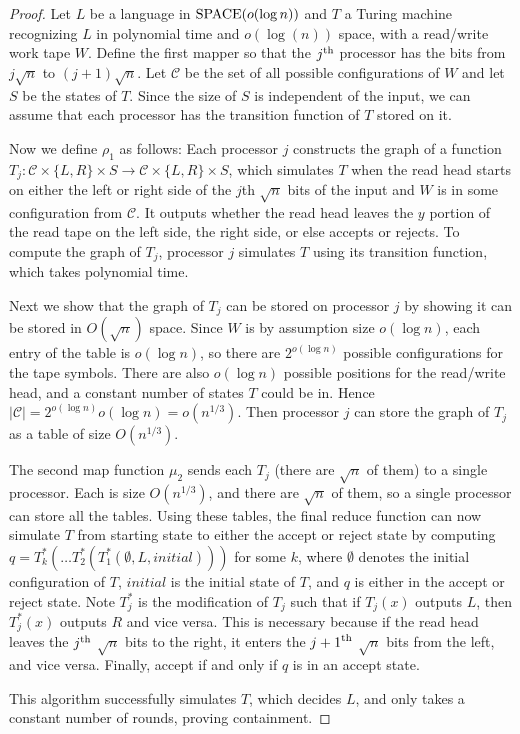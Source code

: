 \documentclass[11pt]{article}
\theoremstyle{definition}
\theoremstyle{remark}
\begin{document}
\begin{proof}
Let $L$ be a language in $\textup{SPACE}(o(\log n))$ and $T$ a Turing machine
recognizing $L$ in polynomial time and $o(\log(n))$ space, with a read/write
work tape $W$. Define the first mapper so that the $j^\textup{th}$ processor
has the bits from $j\sqrt{n}$ to $(j+1)\sqrt{n}$. Let $\mathcal{C}$ be the set
of all possible configurations of $W$ and let $S$ be the states of $T$. Since
the size of $S$ is independent of the input, we can assume that each processor
has the transition function of $T$ stored on it.

Now we define $\rho_1$ as follows: Each processor $j$ constructs the graph of a
function $T_j:\mathcal{C} \times \{L,R\} \times S \rightarrow \mathcal{C}
\times \{L,R\} \times S$, which simulates $T$ when the read head starts on
either the left or right side of the $j$th $\sqrt{n}$ bits of the input and $W$
is in some configuration from $\mathcal{C}$. It outputs whether the read head
leaves the $y$ portion of the read tape on the left side, the right side, or
else accepts or rejects. To compute the graph of $T_j$, processor $j$
simulates $T$ using its transition function, which takes polynomial time.

Next we show that the graph of $T_j$ can be stored on processor $j$ by showing
it can be stored in $O(\sqrt{n})$ space. Since $W$ is by assumption size
$o(\log n)$, each entry of the table is $o(\log n)$, so there are $2^{o(\log
n)}$ possible configurations for the tape symbols. There are also $o(\log n)$
possible positions for the read/write head, and a constant number of states $T$
could be in. Hence $|\mathcal{C}| = 2^{o(\log n)} o(\log n) = o(n^{1/3})$.
Then processor $j$ can store the graph of $T_j$ as a table of size
$O(n^{1/3})$.

The second map function $\mu_2$ sends each $T_j$ (there are $\sqrt{n}$ of them)
to a single processor. Each is size $O(n^{1/3})$, and there are $\sqrt{n}$ of
them, so a single processor can store all the tables. Using these tables, the
final reduce function can now simulate $T$ from starting state to either the
accept or reject state by computing $q=T_k^*(\ldots
T_2^*(T_1^*(\emptyset,L,initial)))$ for some $k$, where $\emptyset$ denotes the
initial configuration of $T$, $initial$ is the initial state of $T$, and $q$ is
either in the accept or reject state. Note $T_j^*$ is the modification of $T_j$
such that if $T_j(x)$ outputs $L$, then $T_j^*(x)$ outputs $R$ and vice versa.
This is necessary because if the read head leaves the $j^\textup{th}$
$\sqrt{n}$ bits to the right, it enters the ${j+1}^\textup{th}$ $\sqrt{n}$ bits
from the left, and vice versa. Finally, accept if and only if $q$ is in an
accept state.

This algorithm successfully simulates $T$, which decides $L$, and only takes a
constant number of rounds, proving containment. \end{proof}
\end{document}
